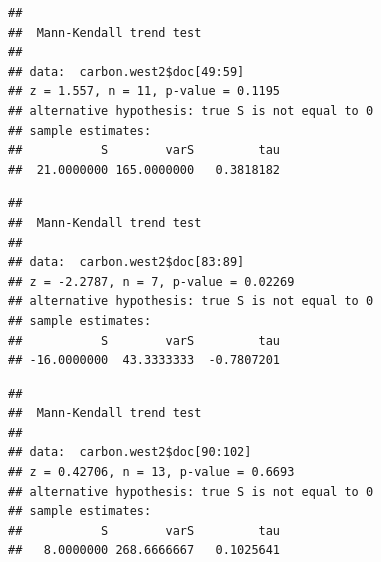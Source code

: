 \documentclass[12pt,]{article}
\newenvironment{Shaded}{\begin{snugshade}}{\end{snugshade}}
\newcommand{\KeywordTok}[1]{\textcolor[rgb]{0.13,0.29,0.53}{\textbf{#1}}}
\newcommand{\DecValTok}[1]{\textcolor[rgb]{0.00,0.00,0.81}{#1}}
\newcommand{\CommentTok}[1]{\textcolor[rgb]{0.56,0.35,0.01}{\textit{#1}}}
\newcommand{\OperatorTok}[1]{\textcolor[rgb]{0.81,0.36,0.00}{\textbf{#1}}}
\newcommand{\NormalTok}[1]{#1}
\begin{document}
\begin{Shaded}
\end{Shaded}

\begin{verbatim}
## 
##  Mann-Kendall trend test
## 
## data:  carbon.west2$doc[49:59]
## z = 1.557, n = 11, p-value = 0.1195
## alternative hypothesis: true S is not equal to 0
## sample estimates:
##           S        varS         tau 
##  21.0000000 165.0000000   0.3818182
\end{verbatim}

\begin{Shaded}
\end{Shaded}

\begin{verbatim}
## 
##  Mann-Kendall trend test
## 
## data:  carbon.west2$doc[83:89]
## z = -2.2787, n = 7, p-value = 0.02269
## alternative hypothesis: true S is not equal to 0
## sample estimates:
##           S        varS         tau 
## -16.0000000  43.3333333  -0.7807201
\end{verbatim}

\begin{Shaded}
\end{Shaded}

\begin{verbatim}
## 
##  Mann-Kendall trend test
## 
## data:  carbon.west2$doc[90:102]
## z = 0.42706, n = 13, p-value = 0.6693
## alternative hypothesis: true S is not equal to 0
## sample estimates:
##           S        varS         tau 
##   8.0000000 268.6666667   0.1025641
\end{verbatim}

\begin{Shaded}
\end{Shaded}
\end{document}
